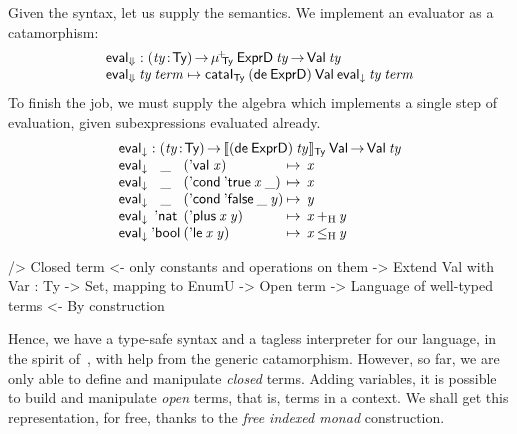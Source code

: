 

\newcommand{\evalH}{\F{eval}_{\green{\Downarrow}}}
\newcommand{\evalOne}{\F{eval}_{\green{\downarrow}}}

Given the syntax, let us supply the semantics. We implement an
evaluator as a catamorphism:
%
\[\stk{
\evalH : \PI{\V{ty}}{\Ty} 
         \muide{\Ty}{\HExprD}\: \V{ty} \To
         \Val{\V{ty}} \\
\evalH\: \V{ty}\: \V{term} \mapsto \cataI_{\Ty} \:
                                 (\toIDesc{\HExprD})\: 
                                 \SYMBVal\: 
                                 \evalOne\: 
                                 \V{ty}\: 
                                 \V{term}
}\]
%
To finish the job, we must supply the algebra which implements a single
step of evaluation, given subexpressions evaluated already.
%
\[\stk{
\evalOne : \PI{\V{ty}}{\Ty}
 \idescop{(\toIDesc{\HExprD})\:\V{ty}}{\Ty}{\SYMBVal}
           \To {\Val{\V{ty}}} \\
\begin{array}{@{}l@{}c@{}l@{\:\mapsto\:\:}l}
\evalOne\: & \_\: & (\SYMBEval\;\V{x})                                            & \V{x} \\
\evalOne\: & \_\: & (\SYMBEcond\:\BoolTrue\:\V{x}\:\_)   & \V{x} \\
\evalOne\: & \_\: & (\SYMBEcond\:\BoolFalse\:\_\:\V{y})  & \V{y} \\
\evalOne\: & \Enat\: & (\SYMBEplus\:\V{x}\:\V{y})   & \V{x} \plusHost \V{y} \\
\evalOne\: & \Ebool\: & (\SYMBEle\:\V{x}\:\V{y})  & \V{x} \leHost \V{y} 
\end{array}
}\]

\begin{wstructure}
    /> Closed term
        <- only constants and operations on them
        -> Extend Val with Var : Ty -> Set, mapping to EnumU
            -> Open term
            -> Language of well-typed terms
                <- By construction
\end{wstructure}

Hence, we have a type-safe syntax and a tagless interpreter for our
language, in the spirit
of~\citet{augustsson.carlsson:dependent.interpreter}, with help from
the generic catamorphism. However, so far, we are only able to define
and manipulate \emph{closed} terms. Adding variables, it is possible
to build and manipulate \emph{open} terms, that is, terms in a
context. We shall get this representation, for free, thanks to the
\emph{free indexed monad} construction.



